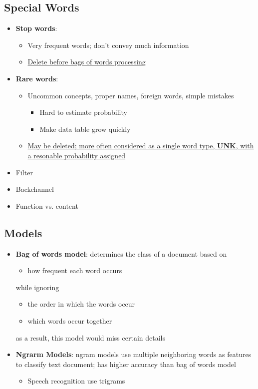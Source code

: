   \subsection{Special Words}

    \begin{itemize}
      \item \textbf{Stop words}:
      \begin{itemize}
        \item Very frequent words; don't convey much information
        \item \ul{Delete before bags of words processing}
      \end{itemize}

      \item \textbf{Rare words}:
      \begin{itemize}
        \item Uncommon concepts, proper names, foreign words, simple mistakes
        \begin{itemize}
          \item Hard to estimate probability
          \item Make data table grow quickly
        \end{itemize}

        \item \ul{May be deleted; more often considered as a single word type,
        \textbf{UNK}, with a resonable probability assigned}
      \end{itemize}
      \item Filter
      \item Backchannel
      \item Function vs. content
    \end{itemize}

  \subsection{Models}

    \begin{itemize}
      \item \textbf{Bag of words model}: determines the class of a document
      based on
      \begin{itemize}
        \item how frequent each word occurs
      \end{itemize}
      while ignoring
      \begin{itemize}
        \item the order in which the words occur
        \item which words occur together
      \end{itemize}
      as a result, this model would miss certain details

      \item \textbf{Ngrarm Models}: ngram models use multiple neighboring words
      as features to classify text document; has higher accuracy than bag
      of words model
      \begin{itemize}
        \item Speech recognition use trigrams
      \end{itemize}
    \end{itemize}